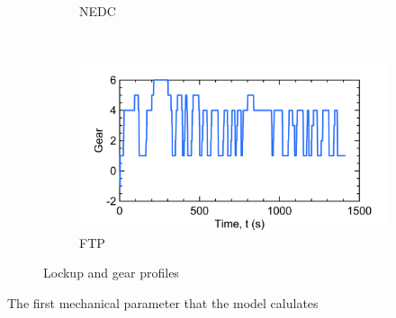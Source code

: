 \begin{figure}[ht]
\begin{subfigure}[b]{0.45\textwidth}
    \caption{NEDC}
    \label{fig:NEDC_gear}
  \end{subfigure}
  ~ %
  \begin{subfigure}[b]{0.45\textwidth}
    \includegraphics[width=\textwidth]{figures/model/FTP_plt_gear.png}
    \caption{FTP}
    \label{fig:FTP_gear}
  \end{subfigure}
  \caption{Lockup and gear profiles}\label{fig:lockup}
\end{figure}

The first mechanical parameter that the model calulates

